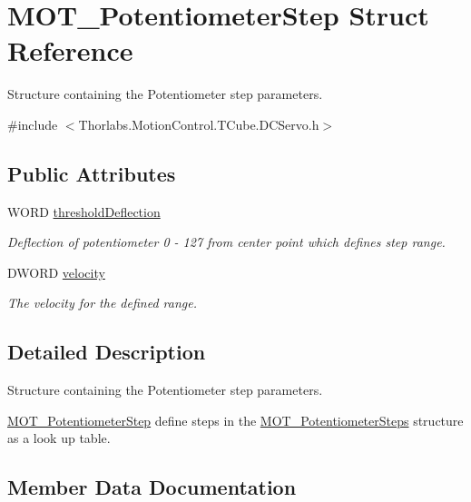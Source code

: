 \hypertarget{struct_m_o_t___potentiometer_step}{}\section{M\+O\+T\+\_\+\+Potentiometer\+Step Struct Reference}
\label{struct_m_o_t___potentiometer_step}


Structure containing the Potentiometer step parameters.  




{\ttfamily \#include $<$Thorlabs.\+Motion\+Control.\+T\+Cube.\+D\+C\+Servo.\+h$>$}

\subsection*{Public Attributes}
\begin{DoxyCompactItemize}
\item 
W\+O\+RD \hyperlink{struct_m_o_t___potentiometer_step_a248efc12a3d3784ff48fd510bb1fb121}{threshold\+Deflection}
\begin{DoxyCompactList}\small\item\em Deflection of potentiometer 0 -\/ 127 from center point which defines step range. \end{DoxyCompactList}\item 
D\+W\+O\+RD \hyperlink{struct_m_o_t___potentiometer_step_a2b60a90461ec1c1b1ae291b30a070cf1}{velocity}
\begin{DoxyCompactList}\small\item\em The velocity for the defined range. \end{DoxyCompactList}\end{DoxyCompactItemize}


\subsection{Detailed Description}
Structure containing the Potentiometer step parameters. 

\hyperlink{struct_m_o_t___potentiometer_step}{M\+O\+T\+\_\+\+Potentiometer\+Step} define steps in the \hyperlink{struct_m_o_t___potentiometer_steps}{M\+O\+T\+\_\+\+Potentiometer\+Steps} structure as a look up table.

\subsection{Member Data Documentation}
